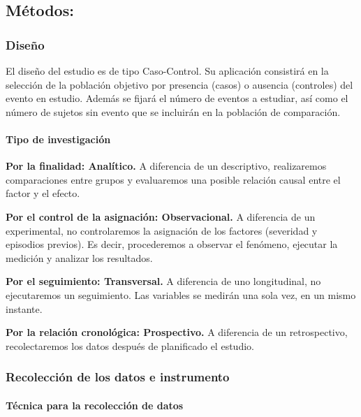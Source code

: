 \documentclass[
  a4paper]{article}
\let\oldparagraph\paragraph
\renewcommand{\paragraph}[1]{\oldparagraph{#1}\mbox{}}
\begin{document}
\hypertarget{muxe9todos}{%
\subsection{Métodos:}\label{muxe9todos}}

\hypertarget{diseuxf1o}{%
\subsubsection{Diseño}\label{diseuxf1o}}

El diseño del estudio es de tipo Caso-Control. Su aplicación consistirá
en la selección de la población objetivo por presencia (casos) o
ausencia (controles) del evento en estudio. Además se fijará el número
de eventos a estudiar, así como el número de sujetos sin evento que se
incluirán en la población de comparación.

\hypertarget{tipo-de-investigaciuxf3n}{%
\paragraph{Tipo de investigación}\label{tipo-de-investigaciuxf3n}}

\textbf{Por la finalidad: Analítico.} A diferencia de un descriptivo,
realizaremos comparaciones entre grupos y evaluaremos una posible
relación causal entre el factor y el efecto.

\textbf{Por el control de la asignación: Observacional.} A diferencia de
un experimental, no controlaremos la asignación de los factores
(severidad y episodios previos). Es decir, procederemos a observar el
fenómeno, ejecutar la medición y analizar los resultados.

\textbf{Por el seguimiento: Transversal.} A diferencia de uno
longitudinal, no ejecutaremos un seguimiento. Las variables se medirán
una sola vez, en un mismo instante.

\textbf{Por la relación cronológica: Prospectivo.} A diferencia de un
retrospectivo, recolectaremos los datos después de planificado el
estudio.

\hypertarget{recolecciuxf3n-de-los-datos-e-instrumento}{%
\subsubsection{Recolección de los datos e
instrumento}\label{recolecciuxf3n-de-los-datos-e-instrumento}}

\hypertarget{tuxe9cnica-para-la-recolecciuxf3n-de-datos}{%
\paragraph{Técnica para la recolección de
datos}\label{tuxe9cnica-para-la-recolecciuxf3n-de-datos}}
\end{document}

